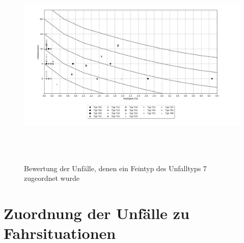 \begin{savenotes}
	\begin{figure}[H]
		\centering
		\includegraphics[width=18cm,height=10cm]{figures/Bewertung_FT7}
		\caption[Bewertung der Unfälle, denen ein Feintyp des Unfalltyps 7 zugeordnet wurde]{Bewertung der Unfälle, denen ein Feintyp des Unfalltyps 7 zugeordnet wurde}\label{fig:Bewertung_FT7}
	\end{figure}
\end{savenotes}

\section{Zuordnung der Unfälle zu Fahrsituationen}\label{section:Zuordnung der Unfälle zu Fahrsituationen}




